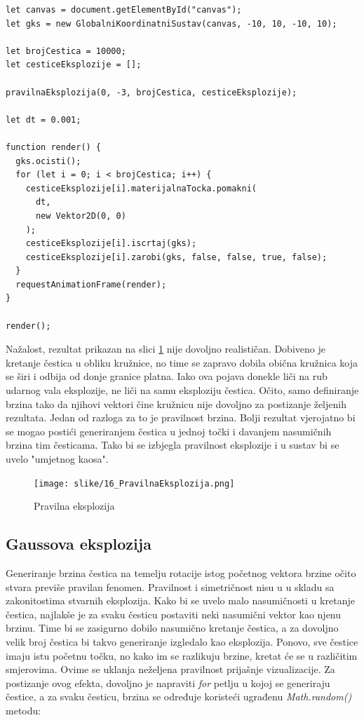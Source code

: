 \documentclass{foi}
\begin{document}
\begin{verbatim}    
let canvas = document.getElementById("canvas");
let gks = new GlobalniKoordinatniSustav(canvas, -10, 10, -10, 10);

let brojCestica = 10000;
let cesticeEksplozije = [];

pravilnaEksplozija(0, -3, brojCestica, cesticeEksplozije);

let dt = 0.001;

function render() {
  gks.ocisti();
  for (let i = 0; i < brojCestica; i++) {
    cesticeEksplozije[i].materijalnaTocka.pomakni(
      dt,
      new Vektor2D(0, 0)
    );
    cesticeEksplozije[i].iscrtaj(gks);
    cesticeEksplozije[i].zarobi(gks, false, false, true, false);
  }
  requestAnimationFrame(render);
}

render();
\end{verbatim}

Nažalost, rezultat prikazan na slici \ref{fig:PravilnaEksplozija} nije dovoljno realističan. Dobiveno je kretanje čestica u obliku kružnice, no time se zapravo dobila obična kružnica koja se širi i odbija od donje granice platna. Iako ova pojava donekle liči na rub udarnog vala eksplozije, ne liči na samu eksploziju čestica. Očito, samo definiranje brzina tako da njihovi vektori čine kružnicu nije dovoljno za postizanje željenih rezultata. Jedan od razloga za to je pravilnost brzina. Bolji rezultat vjerojatno bi se mogao postići generiranjem čestica u jednoj točki i davanjem nasumičnih brzina tim česticama. Tako bi se izbjegla pravilnost eksplozije i u sustav bi se uvelo "umjetnog kaosa". 

\begin{figure}[H]
    \centering
    \texttt{[image: slike/16\_PravilnaEksplozija.png]}
    \captionsetup{justification=centering}
    \caption{Pravilna eksplozija}
\label{fig:PravilnaEksplozija}
\end{figure}


\subsection{Gaussova eksplozija}
Generiranje brzina čestica na temelju rotacije istog početnog vektora brzine očito stvara previše pravilan fenomen. Pravilnost i simetričnost nisu u u skladu sa zakonitostima stvarnih eksplozija. Kako bi se uvelo malo nasumičnosti u kretanje čestica, najlakše je za svaku česticu postaviti neki nasumični vektor kao njenu brzinu. Time bi se zasigurno dobilo nasumično kretanje čestica, a za dovoljno velik broj čestica bi takvo generiranje izgledalo kao eksplozija. Ponovo, sve čestice imaju istu početnu točku, no kako im se razlikuju brzine, kretat će se u različitim smjerovima. Ovime se uklanja neželjena pravilnost prijašnje vizualizacije. Za postizanje ovog efekta, dovoljno je napraviti \textit{for} petlju u kojoj se generiraju čestice, a za svaku česticu, brzina se određuje koristeći ugrađenu  \textit{Math.random()} metodu:
\end{document}
